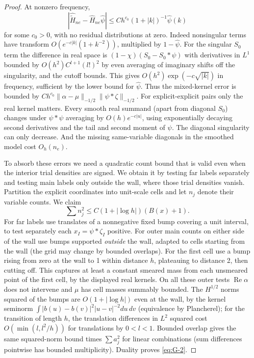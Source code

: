 \begin{proof}
At nonzero frequency,
\[
 |\widehat{\widetilde H}_{ne}-\widehat H_{ne}\widehat\psi|
 \le C h^{c_0}(1+|k|)^{-1}\widehat\psi(k)
\]
for some \(c_0>0\), with no residual distributions at zero. Indeed nonsingular terms have transform \(O(e^{-c|k|}(1+k^{-2}))\), multiplied by \(1-\widehat\psi\). For the singular \(S_0\) term the difference in real space is \((1-\chi)(S_0-S_0*\psi)\) with derivatives in \(L^1\) bounded by \(O(h^2)C^{l+1}(l!)^2\) by even averaging of imaginary shifts off the singularity, and the cutoff bounds. This gives \(O(h^2)\exp(-c\sqrt{|k|})\) in frequency, sufficient by the lower bound for \(\widehat\psi\). Thus the mixed-kernel error is bounded by
\(C h^{c_0}\|\alpha-\mu\|_{-1/2}\|\psi*\zeta\|_{-1/2}\).
For explicit-explicit pairs only the real kernel matters. Every smooth real summand (apart from diagonal \(S_0\)) changes under \(\psi*\psi\) averaging by \(O(h)e^{-c|u|}\), using exponentially decaying second derivatives and the tail and second moment of \(\psi\). The diagonal singularity can only decrease. And the missing same-variable diagonals in the smoothed model cost \(O_h(n_e)\).

To absorb these errors we need a quadratic count bound that is valid even when the interior trial densities are signed. We obtain it by testing far labels separately and testing main labels only outside the wall, where those trial densities vanish. Partition the explicit coordinates into unit-scale cells and let \(n_j\) denote their variable counts. We claim
\begin{equation}
 \sum n_j^2\le C(1+|\log h|)(B(x)+1).
 \label{eq:G-2}
\end{equation}
For far labels use translates of a nonnegative fixed bump covering a unit interval, to test separately each \(x_I=\psi*\zeta_I\) positive. For outer main counts on either side of the wall use bumps supported \emph{outside} the wall, adapted to cells starting from the wall (the grid may change by bounded overlaps). For the first cell use a bump rising from zero at the wall to 1 within distance \(h\), plateauing to distance 2, then cutting off. This captures at least a constant smeared mass from each unsmeared point of the first cell, by the displayed real kernels. On all these outer tests \(\operatorname{Re}\alpha\) does not intervene and \(\mu\) has cell masses summably bounded. The \(H^{1/2}\) norms squared of the bumps are \(O(1+|\log h|)\) even at the wall, by the kernel seminorm \(\int|b(u)-b(v)|^2|u-v|^{-2}du\,dv\) (equivalence by Plancherel); for the transition of length \(h\), the translation differences in \(L^2\) squared cost \(O(\min(l,l^2/h))\) for translations by \(0<l<1\). Bounded overlap gives the same squared-norm bound times \(\sum a_j^2\) for linear combinations (sum differences pointwise has bounded multiplicity). Duality proves \eqref{eq:G-2}.


\end{proof}
